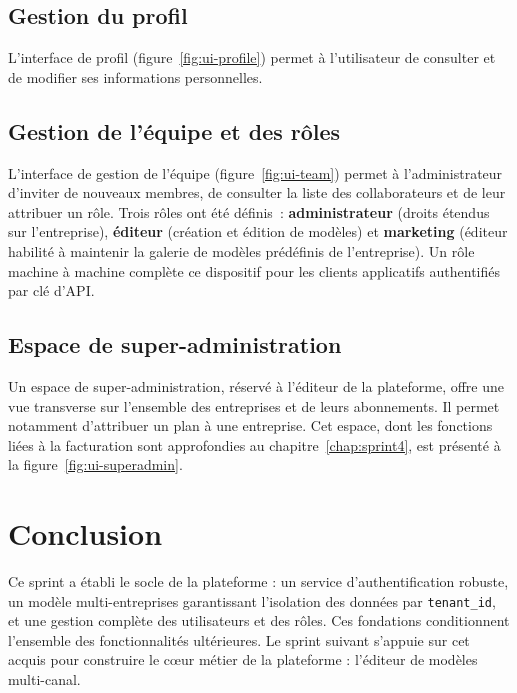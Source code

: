

\subsection{Gestion du profil}
L'interface de profil (figure~\ref{fig:ui-profile}) permet à l'utilisateur
de consulter et de modifier ses informations personnelles.


\subsection{Gestion de l'équipe et des rôles}
L'interface de gestion de l'équipe (figure~\ref{fig:ui-team}) permet à
l'administrateur d'inviter de nouveaux membres, de consulter la liste des
collaborateurs et de leur attribuer un rôle. Trois rôles ont été définis~:
\textbf{administrateur} (droits étendus sur l'entreprise),
\textbf{éditeur} (création et édition de modèles) et \textbf{marketing}
(éditeur habilité à maintenir la galerie de modèles prédéfinis de
l'entreprise). Un rôle machine à machine complète ce dispositif pour les
clients applicatifs authentifiés par clé d'API.


\subsection{Espace de super-administration}
Un espace de super-administration, réservé à l'éditeur de la plateforme,
offre une vue transverse sur l'ensemble des entreprises et de leurs
abonnements. Il permet notamment d'attribuer un plan à une entreprise. Cet
espace, dont les fonctions liées à la facturation sont approfondies au
chapitre~\ref{chap:sprint4}, est présenté à la figure~\ref{fig:ui-superadmin}.


\section*{Conclusion}
Ce sprint a établi le socle de la plateforme : un service d'authentification
robuste, un modèle multi-entreprises garantissant l'isolation des données
par \texttt{tenant\_id}, et une gestion complète des utilisateurs et des
rôles. Ces fondations conditionnent l'ensemble des fonctionnalités
ultérieures. Le sprint suivant s'appuie sur cet acquis pour construire le
c\oe{}ur métier de la plateforme : l'éditeur de modèles multi-canal.
